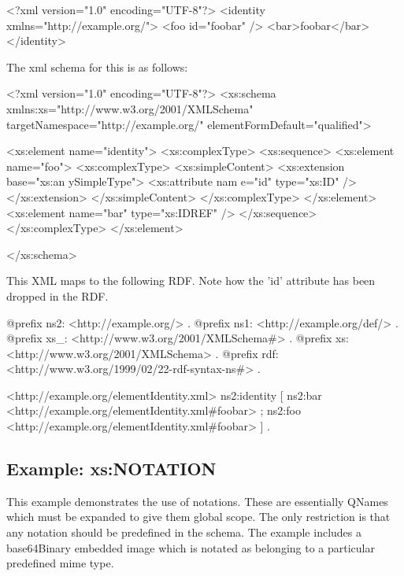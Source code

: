\begin{DoxyCodeInclude}
<?xml version="1.0" encoding="UTF-8"?>
<identity xmlns="http://example.org/">
        <foo id="foobar" />
        <bar>foobar</bar>
</identity>
\end{DoxyCodeInclude}


The xml schema for this is as follows:


\begin{DoxyCodeInclude}
<?xml version="1.0" encoding="UTF-8"?>
<xs:schema xmlns:xs="http://www.w3.org/2001/XMLSchema" 
        targetNamespace="http://example.org/" elementFormDefault="qualified">
        
        <xs:element name="identity">
                <xs:complexType>
                        <xs:sequence>
                                <xs:element name="foo">
                                        <xs:complexType>
                                                <xs:simpleContent>
                                                        <xs:extension base="xs:an
      ySimpleType">
                                                                <xs:attribute nam
      e="id" type="xs:ID" />
                                                        </xs:extension>
                                                </xs:simpleContent>
                                        </xs:complexType>
                                </xs:element>
                                <xs:element name="bar" type="xs:IDREF" />
                        </xs:sequence>
                </xs:complexType>
        </xs:element>

</xs:schema>
\end{DoxyCodeInclude}


This XML maps to the following RDF. Note how the 'id' attribute has been dropped in the RDF.


\begin{DoxyCodeInclude}
@prefix ns2:     <http://example.org/> .
@prefix ns1:     <http://example.org/def/> .
@prefix xs_:     <http://www.w3.org/2001/XMLSchema#> .
@prefix xs:      <http://www.w3.org/2001/XMLSchema> .
@prefix rdf:     <http://www.w3.org/1999/02/22-rdf-syntax-ns#> .

<http://example.org/elementIdentity.xml>
      ns2:identity
              [ ns2:bar <http://example.org/elementIdentity.xml#foobar> ;
                ns2:foo <http://example.org/elementIdentity.xml#foobar>
              ] .
\end{DoxyCodeInclude}
 \hypertarget{attributeNotation}{}\subsection{Example: xs:NOTATION}\label{attributeNotation}
This example demonstrates the use of notations. These are essentially QNames which must be expanded to give them global scope. The only restriction is that any notation should be predefined in the schema. The example includes a base64Binary embedded image which is notated as belonging to a particular predefined mime type.


